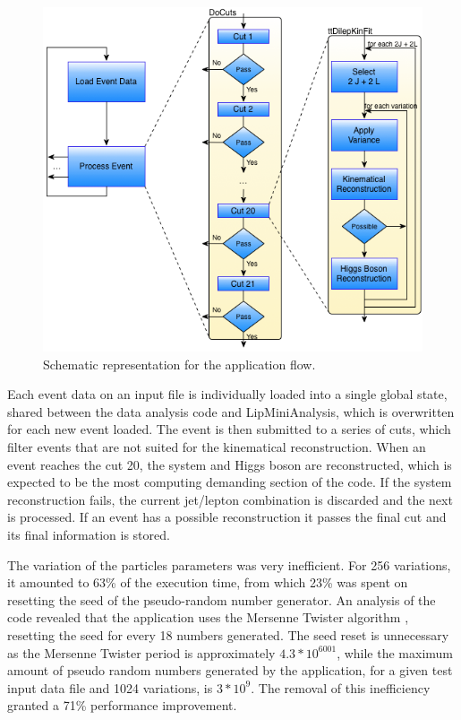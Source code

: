 \begin{figure}[!htp]
	\begin{center}
		\includegraphics[scale=0.5]{imgs/graf_abstract_flow_with_kinfit.png}
		\caption{Schematic representation for the \tth application flow.}
		\label{fig:flow}
	\end{center}
\end{figure}

Each event data on an input file is individually loaded into a single global state, shared between the data analysis code and LipMiniAnalysis, which is overwritten for each new event loaded. The event is then submitted to a series of cuts, which filter events that are not suited for the kinematical reconstruction. When an event reaches the cut 20, the \ttbar system and Higgs boson are reconstructed, which is expected to be the most computing demanding section of the code. If the \ttbar system reconstruction fails, the current jet/lepton combination is discarded and the next is processed. If an event has a possible reconstruction it passes the final cut and its final information is stored.

The variation of the particles parameters was very inefficient. For 256 variations, it amounted to 63\% of the \tth execution time, from which 23\% was spent on resetting the seed of the pseudo-random number generator. An analysis of the code revealed that the application uses the Mersenne Twister algorithm \cite{MersenneTwister}, resetting the seed for every 18 numbers generated. The seed reset is unnecessary as the Mersenne Twister period is approximately $4.3 * 10^{6001}$, while the maximum amount of pseudo random numbers generated by the application, for a given test input data file and 1024 variations, is $3 * 10^9$. The removal of this inefficiency granted a 71\% performance improvement.

